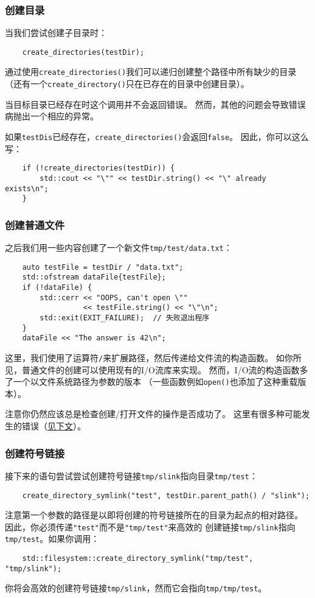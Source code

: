 \subsubsection*{创建目录}
当我们尝试创建子目录时：
\begin{lstlisting}
    create_directories(testDir);
\end{lstlisting}
通过使用\texttt{create\_directories()}我们可以递归创建整个路径中所有缺少的目录
（还有一个\texttt{create\_directory()}只在已存在的目录中创建目录）。

当目标目录已经存在时这个调用并不会返回错误。
然而，其他的问题会导致错误病抛出一个相应的异常。

如果\texttt{testDis}已经存在，\texttt{create\_directories()}会返回\texttt{false}。
因此，你可以这么写：
\begin{lstlisting}
    if (!create_directories(testDir)) {
        std::cout << "\"" << testDir.string() << "\" already exists\n";
    }
\end{lstlisting}

\subsubsection*{创建普通文件}
之后我们用一些内容创建了一个新文件\texttt{tmp/test/data.txt}：
\begin{lstlisting}
    auto testFile = testDir / "data.txt";
    std::ofstream dataFile{testFile};
    if (!dataFile) {
        std::cerr << "OOPS, can't open \""
                  << testFile.string() << "\"\n";
        std::exit(EXIT_FAILURE);  // 失败退出程序
    }
    dataFile << "The answer is 42\n";
\end{lstlisting}
这里，我们使用了运算符\texttt{/}来扩展路径，然后传递给文件流的构造函数。
如你所见，普通文件的创建可以使用现有的I/O流库来实现。
然而，I/O流的构造函数多了一个以文件系统路径为参数的版本
（一些函数例如\texttt{open()}也添加了这种重载版本）。

注意你仍然应该总是检查创建/打开文件的操作是否成功了。
这里有很多种可能发生的错误（\hyperref[ch20.1.3.6]{见下文}）。

\subsubsection*{创建符号链接}
接下来的语句尝试尝试创建符号链接\texttt{tmp/slink}指向目录\texttt{tmp/test}：
\begin{lstlisting}
    create_directory_symlink("test", testDir.parent_path() / "slink");
\end{lstlisting}
注意第一个参数的路径是以即将创建的符号链接所在的目录为起点的相对路径。
因此，你必须传递\texttt{"test"}而不是\texttt{"tmp/test"}来高效的
创建链接\texttt{tmp/slink}指向\texttt{tmp/test}。如果你调用：
\begin{lstlisting}
    std::filesystem::create_directory_symlink("tmp/test", "tmp/slink");
\end{lstlisting}
你将会高效的创建符号链接\texttt{tmp/slink}，然而它会指向\texttt{tmp/tmp/test}。

